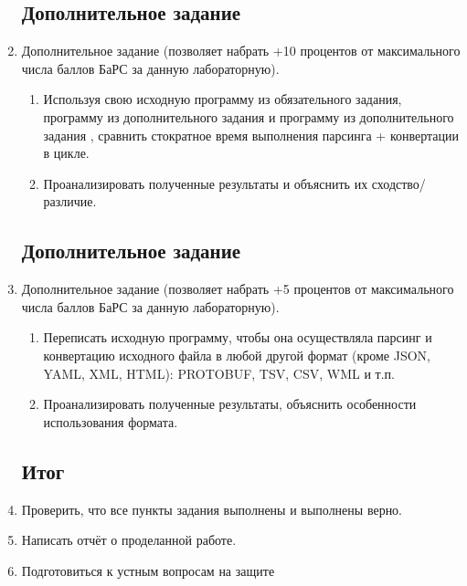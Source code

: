 \begin{enumerate}
            \lstset{language=Python}
            \lstset{language=XML}

            \subsection{Дополнительное задание }
      \item Дополнительное задание  (позволяет набрать +10
            процентов от максимального числа баллов БаРС за данную
            лабораторную).
            \begin{enumerate}
                  \item Используя свою исходную программу из обязательного
                        задания, программу из дополнительного задания  и
                        программу из дополнительного задания , сравнить
                        стократное время выполнения парсинга + конвертации в
                        цикле.
                  \item Проанализировать полученные результаты и объяснить их
                        сходство/различие.
            \end{enumerate}

            \lstset{language=Python}
            \lstset{language=Python}

            \subsection{Дополнительное задание }
      \item  Дополнительное задание  (позволяет набрать +5
            процентов от максимального числа баллов БаРС за данную
            лабораторную).
            \begin{enumerate}
                  \item  Переписать исходную программу, чтобы она осуществляла
                        парсинг и конвертацию исходного файла в любой другой
                        формат (кроме JSON, YAML, XML, HTML): PROTOBUF,
                        TSV, CSV, WML и т.п.
                  \item  Проанализировать полученные результаты, объяснить
                        особенности использования формата.
            \end{enumerate}

            \lstset{language=Python}
            \lstset{language=Python}

            \subsection{Итог}
      \item  Проверить, что все пункты задания выполнены и выполнены верно.
      \item  Написать отчёт о проделанной работе.
      \item  Подготовиться к устным вопросам на защите
\end{enumerate}

